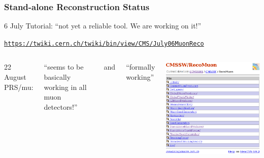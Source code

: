 \documentclass[12pt,compress]{beamer}
\begin{document}
\begin{frame}
\frametitle{Stand-alone Reconstruction Status}

6 July Tutorial: ``not yet a reliable tool.  We are working on it!''

{\tt \scriptsize \href{https://twiki.cern.ch/twiki/bin/view/CMS/July06MuonReco}{https://twiki.cern.ch/twiki/bin/view/CMS/July06MuonReco}}

\vfill
\begin{columns}

22 August PRS/mu:

\vspace{0.25 cm}
``seems to be basically working in all muon detectors!''
\begin{center}
and \mbox{\hspace{2 cm}}
\end{center}
``formally working''

\includegraphics[width=\linewidth]{recomuon.png}
\end{columns}
\end{frame}
\end{document}
